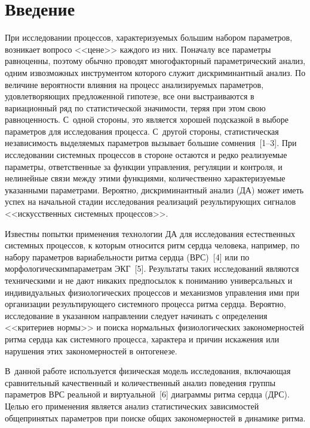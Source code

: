       \begin{multicols}{2}

      \label{st\stat}
  
\section{Введение }

  При исследовании процессов, характеризуемых большим набором 
параметров, возникает вопрос\linebreak о <<цене>> каждого из них. Поначалу все 
па\-ра\-мет\-ры равноценны, поэтому обычно проводят многофакторный 
параметрический анализ, одним из\linebreak возможных инструментом которого служит 
дискриминантный анализ. По величине вероятности влияния на процесс 
анализируемых параметров, удовлетворяющих предложенной гипотезе, все они 
выстраиваются в вариационный ряд по статистической значимости, теряя при 
этом свою равноценность. С~одной стороны, это является хорошей подсказкой 
в выборе параметров для исследования процесса. С~другой стороны, 
статистическая независимость выделяемых параметров вызывает большие 
сомнения~[1--3]. При исследовании сис\-тем\-ных процессов в стороне остаются и 
редко реализуемые параметры, ответственные за функции управления, 
регуляции и контроля, и нелинейные связи между этими функциями, 
количественно характеризуемые указанными параметрами. Вероятно, 
дискриминантный анализ (ДА) может иметь успех на начальной стадии 
исследования реализаций результирующих сигналов <<искусственных 
сис\-тем\-ных процессов>>.
  
  Известны попытки применения технологии ДА для исследования 
естественных системных процессов, к которым относится ритм сердца 
человека, например, по набору параметров вариабельности ритма сердца 
(ВРС)~[4] или по морфологическим\linebreak параметрам ЭКГ~[5]. Результаты таких исследований являются техническими и не дают 
никаких предпосылок к пониманию универсальных и индивидуальных 
физиологических процессов и механизмов управления ими при организации 
результирующего системного процесса ритма сердца. Вероят\-но, исследование в 
указанном направлении следует начинать с определения <<критериев нормы>> 
и поиска нормальных физиологических закономерностей ритма сердца как 
сис\-тем\-но\-го процесса, характера и причин искажения или нарушения этих 
закономерностей в онтогенезе. 
  
  В~данной работе используется физическая модель исследования, 
включающая сравнительный качественный и количественный анализ поведения 
группы параметров ВРС реальной и виртуальной~[6] диаграммы ритма сердца 
(ДРС). Целью его применения является анализ статистических зависимостей 
общепринятых параметров при поиске общих закономерностей в динамике 
ритма. 


\end{multicols}
